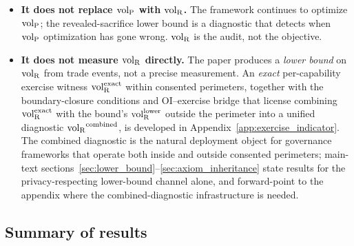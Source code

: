 \begin{itemize}
\item
\textbf{It does not replace ${\operatorname{vol}_{\mathrm{P}}}$ with ${\operatorname{vol}_{\mathrm{R}}}$.}  The framework
continues to optimize ${\operatorname{vol}_{\mathrm{P}}}$; the revealed-sacrifice lower
bound is a diagnostic that detects when ${\operatorname{vol}_{\mathrm{P}}}$ optimization has
gone wrong.  ${\operatorname{vol}_{\mathrm{R}}}$ is the audit, not the objective.

\item
\textbf{It does not measure ${\operatorname{vol}_{\mathrm{R}}}$ directly.}  The paper
produces a \emph{lower bound} on ${\operatorname{vol}_{\mathrm{R}}}$ from trade events, not
a precise measurement.  An \emph{exact} per-capability exercise
witness ${\operatorname{vol}_{\mathrm{R}}^{\mathrm{exact}}}$ within consented perimeters, together
with the boundary-closure conditions and OI--exercise bridge
that license combining ${\operatorname{vol}_{\mathrm{R}}^{\mathrm{exact}}}$ with the bound's
${\operatorname{vol}_{\mathrm{R}}^{\mathrm{lower}}}$ outside the perimeter into a unified diagnostic
${\operatorname{vol}_{\mathrm{R}}}^{\mathrm{combined}}$, is developed in
Appendix~\ref{app:exercise_indicator}.  The combined diagnostic
is the natural deployment object for governance frameworks that
operate both inside and outside consented perimeters; main-text
sections~\ref{sec:lower_bound}--\ref{sec:axiom_inheritance}
state results for the privacy-respecting lower-bound channel
alone, and forward-point to the appendix where the
combined-diagnostic infrastructure is needed.
\end{itemize}

\subsection{Summary of results}

